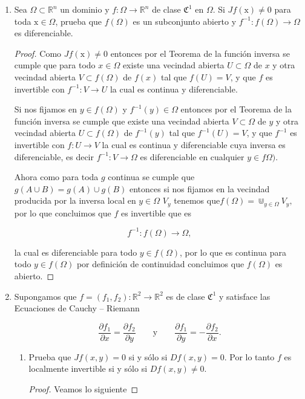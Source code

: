 \documentclass[letterpaper]{article}
\theoremstyle{definition}
\theoremstyle{lemathm}
\theoremstyle{lemathm}
\theoremstyle{lemademthm}
\newcommand{\R}{\mathbb{R}}
\newcommand{\1}{\mathbbm{1}}
\newcommand{\x}{\mathrm x}
\newcommand{\To}{\longrightarrow}
\begin{document}
\begin{enumerate}
		\item Sea $\Omega\subset \R^n$ un dominio y $f:\Omega\To \R^n$ de clase $\mathfrak{C}^1$ en $\Omega$. Si $Jf(\x)\neq 0$ para toda $\x\in \Omega$, prueba que $f(\Omega)$ es un subconjunto abierto y $f^{-1}:f(\Omega)\To \Omega$ es diferenciable.
		
		\begin{proof}
			Como $Jf(\x)\neq 0$ entonces por el Teorema de la función inversa se cumple que para todo $x\in\Omega$ existe una vecindad abierta $U\subset\Omega$ de $x$ y otra vecindad abierta $V\subset f(\Omega)$ de $f(x)$ tal que $f(U) = V$, y que $f$ es invertible con $f^{-1}:V \to U$ la cual es continua y diferenciable.

			Si nos fijamos en $y\in f(\Omega)$ y $f^{-1}(y) \in \Omega$ entonces por el Teorema de la función inversa se cumple que existe una vecindad abierta $V\subset\Omega$ de $y$ y otra vecindad abierta $U\subset f(\Omega)$ de $f^{-1}(y)$ tal que $f^{-1}(U) = V$, y que $f^{-1}$ es invertible con $f:U \to V$ la cual es continua y diferenciable cuya inversa es diferenciable, es decir $f^{-1}:V\to \Omega$ es diferenciable en cualquier $y\in f\Omega)$.

			Ahora como para toda $g$ continua se cumple que $g(A\cup B) = g(A) \cup g(B)$ entonces si nos fijamos en la vecindad producida por la inversa local en $y\in\Omega$ $V_y$ tenemos que$f(\Omega) = \Cup_{y\in\Omega} V_y,$ por lo que concluimos que $f$ es invertible que es
			
			\[f^{-1}: f(\Omega) \to \Omega,\]

			la cual es diferenciable para todo $y\in f(\Omega)$, por lo que es continua para todo $y\in f(\Omega)$ por definición de continuidad concluimos que $f(\Omega)$ es abierto.
		\end{proof}

		\item Supongamos que $f=(f_1,f_2):\R^2\To \R^2$ es de clase $\mathfrak{C}^1$ y satisface las \textsf{Ecuaciones de Cauchy -- Riemann}
		
		\[ \frac{\partial f_1}{\partial x} = \frac{\partial f_2}{\partial y} \qquad \text{y}\qquad \frac{\partial f_1}{\partial  y} = -\frac{\partial f_2}{\partial x}.\]
		
		\begin{enumerate}
			\item Prueba que $Jf(x,y)=0$ si y sólo si $Df(x,y)=0$. Por lo tanto $f$ es localmente invertible si y sólo si $Df(x,y)\neq 0$.
			
			\begin{proof}
				Veamos lo siguiente
				

\end{proof}
\end{enumerate}
\end{enumerate}
\end{document}
